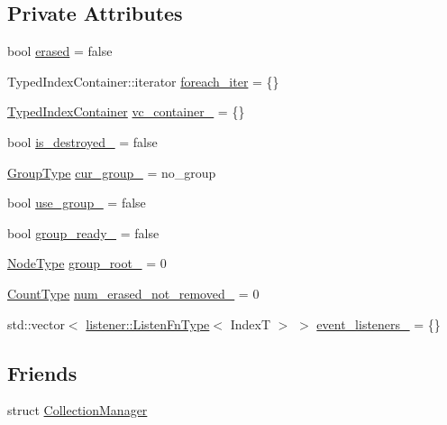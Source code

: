 \subsection*{Private Attributes}
\begin{DoxyCompactItemize}
\item 
bool \hyperlink{structvt_1_1vrt_1_1collection_1_1_holder_a8e12bc6e128cbf4829f13a578219a0be}{erased} = false
\item 
Typed\+Index\+Container\+::iterator \hyperlink{structvt_1_1vrt_1_1collection_1_1_holder_a7c6f6d6603d35f41f549f2184997efd6}{foreach\+\_\+iter} = \{\}
\item 
\hyperlink{structvt_1_1vrt_1_1collection_1_1_holder_a7f238e98ee835799bc876c180a226b0d}{Typed\+Index\+Container} \hyperlink{structvt_1_1vrt_1_1collection_1_1_holder_ab343b98c5353be6ec95cb74fb428dcc6}{vc\+\_\+container\+\_\+} = \{\}
\item 
bool \hyperlink{structvt_1_1vrt_1_1collection_1_1_holder_a2deaf94120926bbab4dfcc818ea4087e}{is\+\_\+destroyed\+\_\+} = false
\item 
\hyperlink{namespacevt_a27b5e4411c9b6140c49100e050e2f743}{Group\+Type} \hyperlink{structvt_1_1vrt_1_1collection_1_1_holder_a18b94e933b0a02c15cbe747ac815a2e8}{cur\+\_\+group\+\_\+} = no\+\_\+group
\item 
bool \hyperlink{structvt_1_1vrt_1_1collection_1_1_holder_aa2e3c8d26988ac5f680f70f59c7bfb37}{use\+\_\+group\+\_\+} = false
\item 
bool \hyperlink{structvt_1_1vrt_1_1collection_1_1_holder_afa3f96bdf578c8a188c1aca64bc343d7}{group\+\_\+ready\+\_\+} = false
\item 
\hyperlink{namespacevt_a866da9d0efc19c0a1ce79e9e492f47e2}{Node\+Type} \hyperlink{structvt_1_1vrt_1_1collection_1_1_holder_ade00ee9b6c49770e4ecf0d2920bb841b}{group\+\_\+root\+\_\+} = 0
\item 
\hyperlink{structvt_1_1vrt_1_1collection_1_1_holder_afdfca52a996f6ac65e6f9e59035f2e3a}{Count\+Type} \hyperlink{structvt_1_1vrt_1_1collection_1_1_holder_aa482ff846286aa20fc6616482275c5aa}{num\+\_\+erased\+\_\+not\+\_\+removed\+\_\+} = 0
\item 
std\+::vector$<$ \hyperlink{namespacevt_1_1vrt_1_1collection_1_1listener_a62d04c44a3c187eae66bdba2090b4505}{listener\+::\+Listen\+Fn\+Type}$<$ IndexT $>$ $>$ \hyperlink{structvt_1_1vrt_1_1collection_1_1_holder_a92cdc5e1e158c07208aa19595114d3a3}{event\+\_\+listeners\+\_\+} = \{\}
\end{DoxyCompactItemize}
\subsection*{Friends}
\begin{DoxyCompactItemize}
\item 
struct \hyperlink{structvt_1_1vrt_1_1collection_1_1_holder_af9288b1963f434a90b307b5305a49510}{Collection\+Manager}
\end{DoxyCompactItemize}


